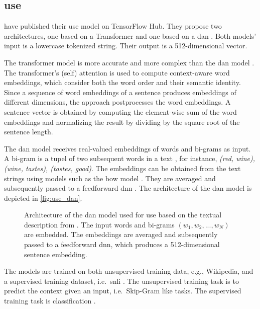 \subsection{\acl*{use}}\label{subsec:univ-sent-encoder}

\citeauthor{UniversalSentEnc2018} have published their \acf{use} model on TensorFlow Hub.
They propose two architectures, one based on a Transformer and one based on a \ac{dan} \cite{UniversalSentEnc2018}.
Both models' input is a lowercase tokenized string.
Their output is a 512-dimensional vector.

The transformer model is more accurate and more complex than the \ac{dan} model \cite{UniversalSentEnc2018}.
The transformer's (self) attention is used to compute context-aware word embeddings, which consider both the word order and their semantic identity.
Since a sequence of word embeddings of a sentence produces embeddings of different dimensions, the approach postprocesses the word embeddings.
A sentence vector is obtained by computing the element-wise sum of the word embeddings 
and normalizing the result by dividing by the square root of the sentence length.

The \ac{dan} model receives real-valued embeddings of words and bi-grams as input.
A bi-gram is a tupel of two subsequent words in a text \cite{nlp-book2009}, for instance, \textit{(red, wine), (wine, tastes), (tastes, good)}.
The embeddings can be obtained from the text strings using models such as the \ac{bow} model \cite{UniversalSentEnc-dan-input-emb}.
They are averaged and subsequently passed to a feedforward \ac{dnn} \cite{UniversalSentEnc2018}.
The architecture of the \ac{dan} model is depicted in \autoref{fig:use_dan}.

\begin{figure}[!htp] %
    \centering
    
    \caption[Architecture of \acs*{use}]{Architecture of the \acs*{dan} model used for \acs*{use} based on the textual description from \cite{inferSent2018}.
    The input words and bi-grams $(w_1, w_2, ..., w_N)$ are embedded.
    The embeddings are averaged and subsequently passed to a feedforward \acs*{dnn}, which produces a 512-dimensional sentence embedding.
    }
    \label{fig:use_dan}
\end{figure}

The models are trained on both unsupervised training data, e.g., Wikipedia, and a supervised training dataset, i.e.\ \ac{snli} \cite{UniversalSentEnc2018, HfsentTrans2019}.
The unsupervised training task is to predict the context given an input, i.e.\ Skip-Gram like tasks.
The supervised training task is classification \cite{UniversalSentEnc2018}.

